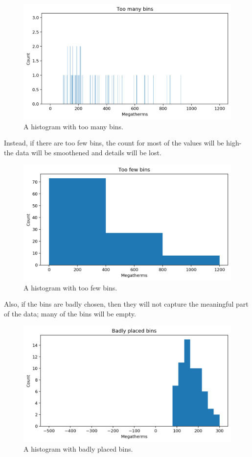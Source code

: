 \documentclass[a4paper, openany]{memoir}
\begin{document}
\begin{figure}[H]
    \centering
    \includegraphics[scale=0.4]{src/2.26 Gas Example Plot 11.png}
    \caption{A histogram with too many bins.}
\end{figure}
\noindent Instead, if there are too few bins, the count for most of the values will be high- the data will be smoothened and details will be lost.
\begin{figure}[H]
    \centering
    \includegraphics[scale=0.4]{src/2.27 Gas Example Plot 12.png}
    \caption{A histogram with too few bins.}
\end{figure}
\noindent Also, if the bins are badly chosen, then they will not capture the meaningful part of the data; many of the bins will be empty.
\begin{figure}[H]
    \centering
    \includegraphics[scale=0.4]{src/2.28 Gas Example Plot 13.png}
    \caption{A histogram with badly placed bins.}
\end{figure}
\end{document}
